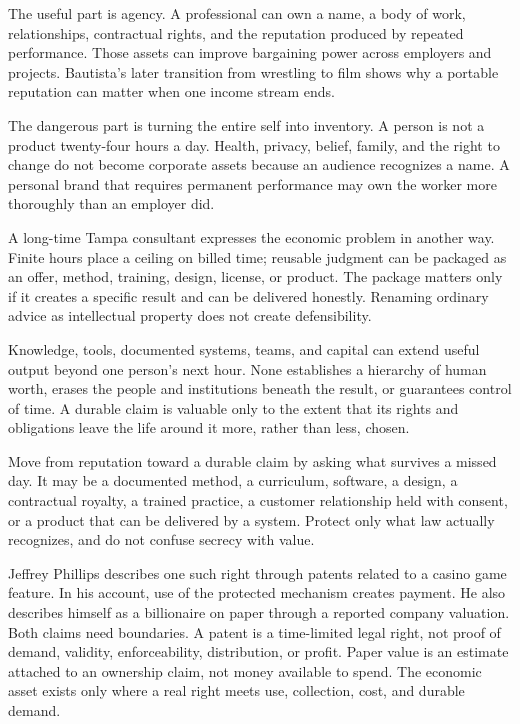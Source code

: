 The useful part is agency. A professional can own a name, a body of work,
relationships, contractual rights, and the reputation produced by repeated
performance. Those assets can improve bargaining power across employers and
projects. Bautista's later transition from wrestling to film shows why a
portable reputation can matter when one income stream ends.

The dangerous part is turning the entire self into inventory. A person is not
a product twenty-four hours a day. Health, privacy, belief, family, and the
right to change do not become corporate assets because an audience recognizes
a name. A personal brand that requires permanent performance may own the
worker more thoroughly than an employer did.

A long-time Tampa consultant expresses the economic problem in another way.
Finite hours place a ceiling on billed time; reusable judgment can be packaged
as an offer, method, training, design, license, or product. The package matters
only if it creates a specific result and can be delivered honestly. Renaming
ordinary advice as intellectual property does not create defensibility.

Knowledge, tools, documented systems, teams, and capital can extend useful
output beyond one person's next hour. None establishes a hierarchy of human
worth, erases the people and institutions beneath the result, or guarantees
control of time. A durable claim is valuable only to the extent that its rights
and obligations leave the life around it more, rather than less, chosen.

Move from reputation toward a durable claim by asking what survives a missed
day. It may be a documented method, a curriculum, software, a design, a
contractual royalty, a trained practice, a customer relationship held with
consent, or a product that can be delivered by a system. Protect only what law
actually recognizes, and do not confuse secrecy with value.

Jeffrey Phillips describes one such right through patents related to a casino
game feature. In his account, use of the protected mechanism creates payment.
He also describes himself as a billionaire on paper through a reported company
valuation. Both claims need boundaries. A patent is a time-limited legal right,
not proof of demand, validity, enforceability, distribution, or profit. Paper
value is an estimate attached to an ownership claim, not money available to
spend. The economic asset exists only where a real right meets use, collection,
cost, and durable demand.


